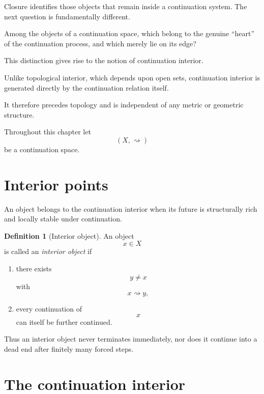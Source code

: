 \documentclass[13pt,openany]{book}
\theoremstyle{plain}
\theoremstyle{definition}
\newtheorem{definition}{Definition}[chapter]
\begin{document}
Closure identifies those objects that remain inside a continuation system.
The next question is fundamentally different.

Among the objects of a continuation space, which belong to the genuine
``heart'' of the continuation process, and which merely lie on its edge?

This distinction gives rise to the notion of continuation interior.

Unlike topological interior, which depends upon open sets, continuation
interior is generated directly by the continuation relation itself.

It therefore precedes topology and is independent of any metric or geometric
structure.

Throughout this chapter let
\[
(X,\rightsquigarrow)
\]
be a continuation space.


\section{Interior points}

An object belongs to the continuation interior when its future is
structurally rich and locally stable under continuation.

\begin{definition}[Interior object]

An object
\[
x\in X
\]
is called an \emph{interior object} if

\begin{enumerate}

\item
there exists
\[
y\neq x
\]
with
\[
x\rightsquigarrow y,
\]

\item
every continuation of
\[
x
\]
can itself be further continued.

\end{enumerate}

\end{definition}

Thus an interior object never terminates immediately, nor does it continue
into a dead end after finitely many forced steps.


\section{The continuation interior}
\end{document}
